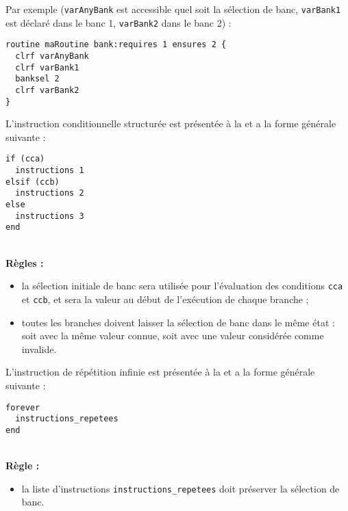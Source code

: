 Par exemple (\texttt{varAnyBank} est accessible quel soit la sélection de banc, \texttt{varBank1} est déclaré dans le banc 1, \texttt{varBank2} dans le banc 2) :
\begin{lstlisting}[language=piccolo]
routine maRoutine bank:requires 1 ensures 2 {
  clrf varAnyBank
  clrf varBank1
  banksel 2
  clrf varBank2
}
\end{lstlisting}










L'instruction conditionnelle structurée est présentée à la  et a la forme générale suivante :

\begin{lstlisting}[language=piccolo]
if (cca)
  instructions 1
elsif (ccb)
  instructions 2
else
  instructions 3
end
\end{lstlisting}

~\\
\textbf{Règles :}
\begin{itemize}
  \item la sélection initiale de banc sera utilisée pour l’évaluation des conditions \texttt{cca} et \texttt{ccb}, et sera la valeur au début de l'exécution de chaque branche ;
  \item toutes les branches doivent laisser la sélection de banc dans le même état : soit avec la même valeur connue, soit avec une valeur considérée comme invalide.
\end{itemize}



L'instruction de répétition infinie est présentée à la  et a la forme générale suivante :

\begin{lstlisting}[language=piccolo]
forever
  instructions_repetees
end
\end{lstlisting}

~\\
\textbf{Règle :}
\begin{itemize}
  \item la liste d'instructions \texttt{instructions\_repetees} doit préserver la sélection de banc.
\end{itemize}



